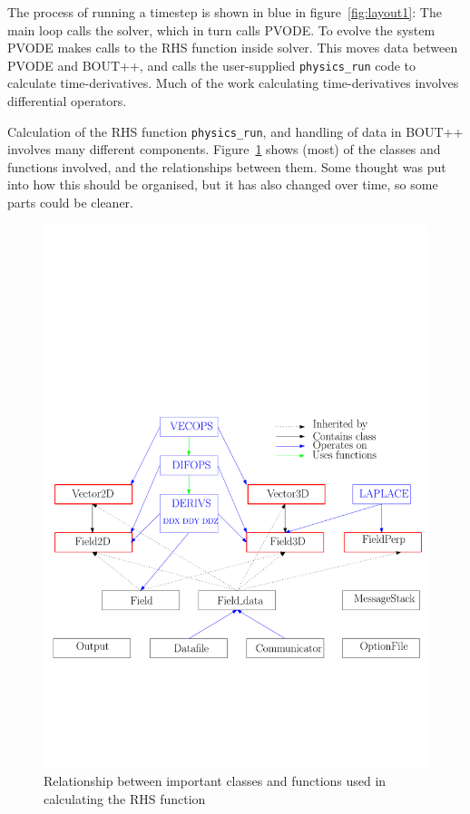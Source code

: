 \documentclass[12pt]{article}
\newcommand{\code}[1]{\texttt{#1}}
\begin{document}
The process of running a timestep is shown in blue in figure~\ref{fig:layout1}:
The main loop calls the solver, which in turn calls PVODE. To evolve the system
PVODE makes calls to the RHS function inside solver. This moves data between PVODE
and BOUT++, and calls the user-supplied \code{physics\_run} code to calculate
time-derivatives. Much of the work calculating time-derivatives involves differential
operators.

Calculation of the RHS function \code{physics\_run}, and handling of data
in BOUT++ involves many different components. Figure~\ref{fig:layout2}
shows (most) of the classes and functions involved, and the relationships
between them. Some thought was put into how this should be organised, but
it has also changed over time, so some parts could be cleaner.
\begin{figure}[htbp!]
\centering
\includegraphics[width=0.6\paperwidth, keepaspectratio]{figs/layout2.pdf}
\caption{Relationship between important classes and functions used in calculating the RHS function}
\label{fig:layout2}
\end{figure}
\end{document}

